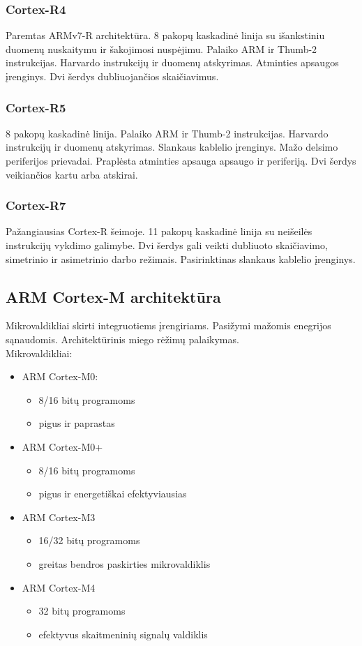 \documentclass[a4paper, 12pt]{article} %
\begin{document}
\begin{onehalfspacing}
\subsubsection{Cortex-R4}
Paremtas ARMv7-R architekt\={u}ra. 8 pakop\k{u} kaskadin\.{e} linija su i\v{s}ankstiniu duomen\k{u} nuskaitymu ir \v{s}akojimosi nusp\.{e}jimu. Palaiko ARM ir Thumb-2 instrukcijas. Harvardo instrukcij\k{u} ir duomen\k{u} atskyrimas. Atminties apsaugos \k{i}renginys. Dvi \v{s}erdys dubliuojan\v{c}ios skai\v{c}iavimus.  
\subsubsection{Cortex-R5}
8 pakop\k{u} kaskadin\.{e} linija. Palaiko ARM ir Thumb-2 instrukcijas. Harvardo instrukcij\k{u} ir duomen\k{u} atskyrimas. Slankaus kablelio \k{i}renginys. Ma\v{z}o delsimo periferijos prievadai. Prapl\.{e}sta atminties apsauga apsaugo ir periferij\k{a}. Dvi \v{s}erdys veikian\v{c}ios kartu arba atskirai.
\subsubsection{Cortex-R7}
Pa\v{z}angiausias Cortex-R \v{s}eimoje. 11 pakop\k{u} kaskadin\.{e} linija su nei\v{s}eil\.{e}s instrukcij\k{u} vykdimo galimybe. Dvi \v{s}erdys gali veikti dubliuoto skai\v{c}iavimo, simetrinio ir asimetrinio darbo re\v{z}imais. Pasirinktinas slankaus kablelio \k{i}renginys.  

\subsection{ARM Cortex-M architekt\={u}ra}
Mikrovaldikliai skirti integruotiems \k{i}rengiriams. Pasi\v{z}ymi ma\v{z}omis enegrijos s\k{a}naudomis. Architekt\={u}rinis miego r\.{e}\v{z}im\k{u} palaikymas. \\
Mikrovaldikliai:
\begin{itemize}
\item ARM Cortex-M0:
\begin{itemize}
\item 8/16 bit\k{u} programoms
\item pigus ir paprastas
\end{itemize}
\item ARM Cortex-M0+
\begin{itemize}
\item 8/16 bit\k{u} programoms
\item pigus ir energeti\v{s}kai efektyviausias
\end{itemize}
\item ARM Cortex-M3
\begin{itemize}
\item 16/32 bit\k{u} programoms
\item greitas bendros paskirties mikrovaldiklis
\end{itemize}
\item ARM Cortex-M4
\begin{itemize}
\item 32 bit\k{u} programoms
\item efektyvus skaitmenini\k{u} signal\k{u} valdiklis
\end{itemize}


\end{itemize}
\end{onehalfspacing}
\end{document}
